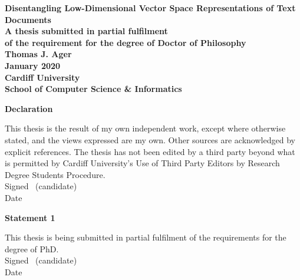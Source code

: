 \documentclass[a4paper,oneside,onecolumn,openright,12pt]{book}
\begin{document}
\frontmatter


\begin{titlepage}

\begin{center}
\vspace*{3ex}
\textbf{\Huge Disentangling Low-Dimensional Vector Space Representations of Text Documents}\\[2ex]
\textbf{\large A thesis submitted in partial fulfilment}\\[1ex]
\textbf{\large of the requirement for the degree of Doctor of
  Philosophy}\\[16ex]
\textbf{\LARGE Thomas J. Ager}\\
\vfill
\textbf{\LARGE January 2020}\\
\vfill
\textbf{\LARGE Cardiff University}\\[1ex]
\textbf{\LARGE School of Computer Science \& Informatics}\\[4ex]
\end{center}

\end{titlepage}
\newpage\thispagestyle{empty}\cleardoublepage


\thispagestyle{plain}

\textbf{\large Declaration}

This thesis is the result of my own independent work, except where otherwise stated,
and the views expressed are my own. Other sources are acknowledged by explicit references.
The thesis has not been edited by a third party beyond what is permitted by
Cardiff University's Use of Third Party Editors by Research Degree Students Procedure.\\[2ex]
Signed \dotfill \ (candidate) \hspace*{10em}\\[1ex]
Date\ \ \ \ \ \dotfill \hspace*{18em}

\vfill

\vfill

\textbf{\large Statement 1}

This thesis is being submitted in partial fulfilment of the requirements for the degree of PhD.\\[2ex]
Signed \dotfill \ (candidate) \hspace*{10em}\\[1ex]
Date\ \ \ \ \ \dotfill \hspace*{18em}
\end{document}
